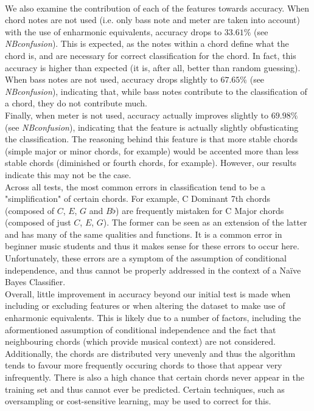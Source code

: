 \documentclass[a4paper]{article}
\begin{document}
\\[12pt]
We also examine the contribution of each of the features towards accuracy. When chord notes are not used (i.e. only bass note and meter are taken into account) with the use of enharmonic equivalents, accuracy drops to $33.61\%$ (see \textit{NB\textunderscore confusion}). This is expected, as the notes within a chord define what the chord is, and are necessary for correct classification for the chord. In fact, this accuracy is higher than expected (it is, after all, better than random guessing). When bass notes are not used, accuracy drops slightly to $67.65\%$ (see \textit{NB\textunderscore confusion}), indicating that, while bass notes contribute to the classification of a chord, they do not contribute much. 
\\[12pt]
Finally, when meter is not used, accuracy actually improves slightly to $69.98\%$ (see \textit{NB\textunderscore confusion}), indicating that the feature is actually slightly obfusticating the classification. The reasoning behind this feature is that more stable chords (simple major or minor chords, for example) would be accented more than less stable chords (diminished or fourth chords, for example). However, our results indicate this may not be the case.
\\[12pt]
Across all tests, the most common errors in classification tend to be a "simplification" of certain chords. For example, C Dominant 7th chords (composed of $C$, $E$, $G$ and $B\flat$) are frequently mistaken for C Major chords (composed of just $C$, $E$, $G$). The former can be seen as an extension of the latter and has many of the same qualities and functions. It is a common error in beginner music students and thus it makes sense for these errors to occur here. Unfortunately, these errors are a symptom of the assumption of conditional independence, and thus cannot be properly addressed in the context of a Naïve Bayes Classifier.
\\[12pt]
Overall, little improvement in accuracy beyond our initial test is made when including or excluding features or when altering the dataset to make use of enharmonic equivalents. This is likely due to a number of factors, including the aformentioned assumption of conditional independence and the fact that neighbouring chords (which provide musical context) are not considered. Additionally, the chords are distributed very unevenly and thus the algorithm tends to favour more frequently occuring chords to those that appear very infrequently. There is also a high chance that certain chords never appear in the training set and thus cannot ever be predicted. Certain techniques, such as oversampling or cost-sensitive learning, may be used to correct for this.
\end{document}
